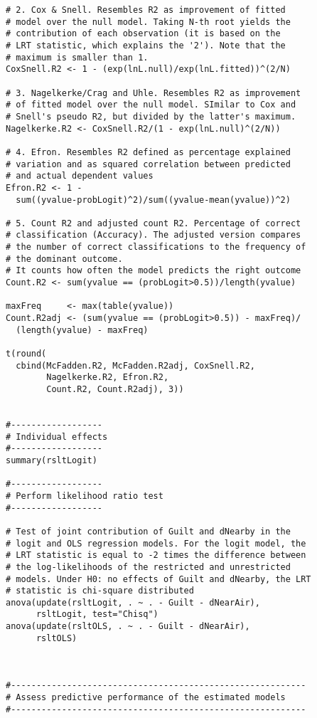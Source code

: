 \documentclass{article}
\begin{document}
\begin{tiny}
\begin{verbatim}
# 2. Cox & Snell. Resembles R2 as improvement of fitted 
# model over the null model. Taking N-th root yields the 
# contribution of each observation (it is based on the 
# LRT statistic, which explains the '2'). Note that the 
# maximum is smaller than 1.
CoxSnell.R2 <- 1 - (exp(lnL.null)/exp(lnL.fitted))^(2/N)

# 3. Nagelkerke/Crag and Uhle. Resembles R2 as improvement
# of fitted model over the null model. SImilar to Cox and 
# Snell's pseudo R2, but divided by the latter's maximum.
Nagelkerke.R2 <- CoxSnell.R2/(1 - exp(lnL.null)^(2/N))

# 4. Efron. Resembles R2 defined as percentage explained 
# variation and as squared correlation between predicted 
# and actual dependent values
Efron.R2 <- 1 - 
  sum((yvalue-probLogit)^2)/sum((yvalue-mean(yvalue))^2)

# 5. Count R2 and adjusted count R2. Percentage of correct 
# classification (Accuracy). The adjusted version compares 
# the number of correct classifications to the frequency of
# the dominant outcome.
# It counts how often the model predicts the right outcome
Count.R2 <- sum(yvalue == (probLogit>0.5))/length(yvalue)

maxFreq     <- max(table(yvalue))
Count.R2adj <- (sum(yvalue == (probLogit>0.5)) - maxFreq)/
  (length(yvalue) - maxFreq)

t(round(
  cbind(McFadden.R2, McFadden.R2adj, CoxSnell.R2, 
        Nagelkerke.R2, Efron.R2, 
        Count.R2, Count.R2adj), 3))


#------------------
# Individual effects
#------------------
summary(rsltLogit)

#------------------
# Perform likelihood ratio test
#------------------

# Test of joint contribution of Guilt and dNearby in the 
# logit and OLS regression models. For the logit model, the
# LRT statistic is equal to -2 times the difference between 
# the log-likelihoods of the restricted and unrestricted 
# models. Under H0: no effects of Guilt and dNearby, the LRT 
# statistic is chi-square distributed
anova(update(rsltLogit, . ~ . - Guilt - dNearAir),
      rsltLogit, test="Chisq")
anova(update(rsltOLS, . ~ . - Guilt - dNearAir),
      rsltOLS)



#----------------------------------------------------------
# Assess predictive performance of the estimated models
#----------------------------------------------------------


\end{verbatim}
\end{tiny}
\end{document}
